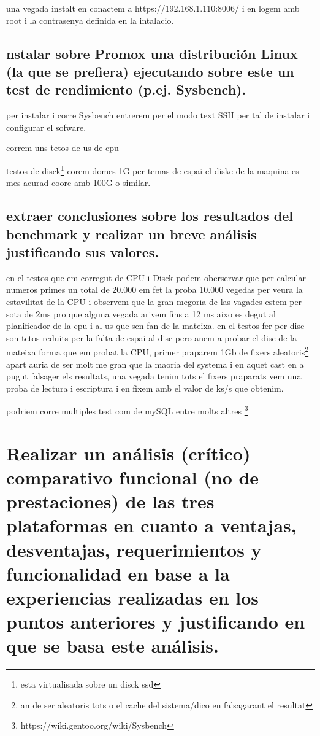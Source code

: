 \documentclass[preprint,11pt]{elsarticle}
\begin{document}
una vegada instalt en conactem a https://192.168.1.110:8006/ i en logem amb root i la contrasenya definida en la intalacio. 

\clearpage

\subsection{nstalar sobre Promox una distribución Linux (la que se prefiera) ejecutando sobre este un test de rendimiento (p.ej. Sysbench).}

per instalar i corre Sysbench entrerem per el modo text SSH per tal de instalar i configurar el sofware.
\smallskip

correm uns tetos de us de cpu 
\smallskip

\clearpage

testos de disck\footnote{esta virtualisada sobre un disck ssd} corem domes 1G per temas de espai el diskc de la maquina es mes acurad coore amb 100G o similar.

\smallskip

\subsection{extraer conclusiones sobre los resultados del benchmark y realizar un breve análisis justificando sus valores.}
en el testos que em corregut de CPU i Disck podem oberservar que per calcular numeros primes un total de 20.000 em fet la proba 10.000 vegedas per veura la estavilitat de la CPU i observem que la gran megoria de las vagades estem per sota de 2ms pro que alguna vegada arivem fins a 12 ms aixo es degut al planificador de la cpu i al us que sen fan de la mateixa.\newline
en el testos fer per disc son tetos reduits per la falta de espai al disc pero anem a probar el disc de la mateixa forma que em probat la CPU, primer praparem 1Gb de fixers aleatoris\footnote{an de ser aleatoris tots o el cache del sistema/dico en falsagarant el resultat} apart auria de ser molt me gran que la maoria del systema i en aquet cast en a pugut falsager els resultats, una vegada tenim tots el fixers praparats vem una proba de lectura i escriptura i en fixem amb el valor de ks/s que obtenim.\smallskip

podriem corre multiples test com de mySQL entre molts altres \footnote{https://wiki.gentoo.org/wiki/Sysbench}

\section{Realizar un análisis (crítico) comparativo funcional (no de prestaciones) de las tres plataformas en cuanto a ventajas, desventajas, requerimientos y funcionalidad en base a la experiencias realizadas en los puntos anteriores y justificando en que se basa este análisis.}
\end{document}
